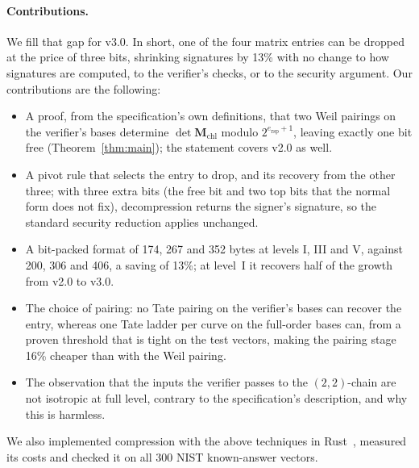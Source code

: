 \documentclass[version=submission]{iacrcc}
\newcommand{\ers}{e_{\mathrm{rsp}}}
\newcommand{\Mm}{\mathbf{M}}
\begin{document}
\paragraph{Contributions.}
We fill that gap for v3.0. In short, one of the four matrix entries can be dropped at the price of three bits, shrinking signatures by 13\% with no change to how signatures are computed, to the verifier's checks, or to the security argument.
Our contributions are the following:
\begin{itemize}
  \item A proof, from the specification's own definitions, that two Weil
  pairings on the verifier's bases determine $\det \Mm_{\mathrm{chl}}$
  modulo $2^{\ers + 1}$, leaving exactly one bit free (Theorem~\ref{thm:main}); the statement covers v2.0 as well.
  \item A pivot rule that selects the entry to drop, and its recovery
  from the other three; with three extra bits (the free bit and two top bits that the normal form does not fix), decompression returns the signer's signature, so the standard security reduction
  applies unchanged.
  \item A bit-packed format of 174, 267 and 352 bytes at levels I, III
  and V, against 200, 306 and 406, a saving of 13\%; at level~I it
  recovers half of the growth from v2.0 to v3.0.
  \item The choice of pairing: no Tate pairing on the verifier's bases
  can recover the entry, whereas one Tate ladder per curve on the
  full-order bases can, from a proven threshold that is tight on the
  test vectors, making the pairing stage 16\% cheaper than with the Weil
  pairing.
  \item The observation that the inputs the verifier passes to the
  $(2,2)$-chain are not isotropic at full level, contrary to the
  specification's description, and why this is harmless.
\end{itemize}
We also implemented compression with the above techniques in Rust~\cite{artifact}, measured its costs
and checked it on all 300 NIST known-answer vectors.
\end{document}
